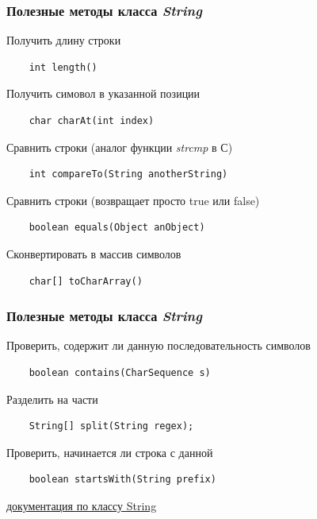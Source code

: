\begin{frame}[fragile]
	\frametitle{Полезные методы класса \textit{String}}

	\begin{large}
	Получить длину строки
	\begin{verbatim}
	int length()
	\end{verbatim}

	Получить симовол в указанной позиции
	\begin{verbatim}
	char charAt(int index)
	\end{verbatim}

	Сравнить строки (аналог функции \emph{strcmp} в С)
	\begin{verbatim}
	int compareTo(String anotherString) 
	\end{verbatim}

	Сравнить строки (возвращает просто true или false)
	\begin{verbatim}
	boolean equals(Object anObject)
	\end{verbatim}

	Сконвертировать в массив символов
	\begin{verbatim}
	char[] toCharArray()
	\end{verbatim}
	\end{large}
\end{frame}

\begin{frame}[fragile]
	\frametitle{Полезные методы класса \textit{String}}

	\begin{large}
	Проверить, содержит ли данную последовательность символов
	\begin{verbatim}
	boolean contains(CharSequence s)
	\end{verbatim}

	Разделить на части
	\begin{verbatim}
	String[] split(String regex);
	\end{verbatim}

	Проверить, начинается ли строка с данной
	\begin{verbatim}
	boolean startsWith(String prefix)
	\end{verbatim}

	\href{http://docs.oracle.com/javase/6/docs/api/java/lang/String.html}{документация по классу String}
	\end{large}
\end{frame}

